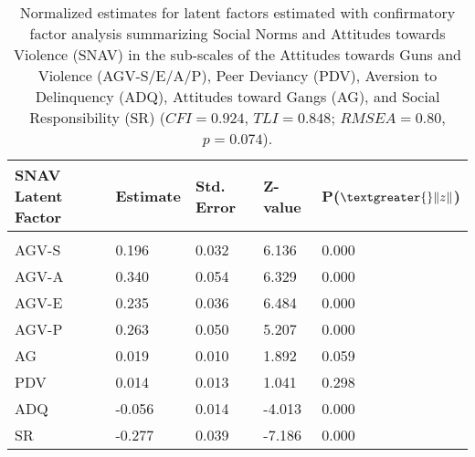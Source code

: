 \documentclass[utf8]{article}
\begin{document}
\begin{table}[]
\begin{tabular}{lllll}
SNAV Latent Factor & Estimate & Std. Error & Z-value & P($\textgreater{}\|z\|$) \\ \hline
                   &          &            &         &                          \\
AGV-S              & 0.196    & 0.032      & 6.136   & 0.000                    \\
AGV-A              & 0.340    & 0.054      & 6.329   & 0.000                    \\
AGV-E              & 0.235    & 0.036      & 6.484   & 0.000                    \\
AGV-P              & 0.263    & 0.050      & 5.207   & 0.000                    \\
AG                 & 0.019    & 0.010      & 1.892   & 0.059                    \\
PDV                & 0.014    & 0.013      & 1.041   & 0.298                    \\
ADQ                & -0.056   & 0.014      & -4.013  & 0.000                    \\
SR                 & -0.277   & 0.039      & -7.186  & 0.000                   
\end{tabular}
\caption{Normalized estimates for latent factors estimated with confirmatory factor analysis summarizing Social Norms and Attitudes towards Violence (SNAV) in the sub-scales of the Attitudes towards Guns and Violence (AGV-S/E/A/P), Peer Deviancy (PDV), Aversion to Delinquency (ADQ), Attitudes toward Gangs (AG), and Social Responsibility (SR) ($CFI=0.924$, $TLI=0.848$; $RMSEA=0.80$, $p=0.074$).\label{tab:9}}
\end{table}
\end{document}
